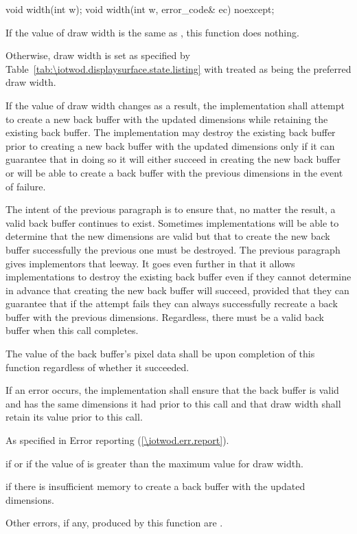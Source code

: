 %
\begin{itemdecl}
void width(int w);
void width(int w, error_code& ec) noexcept;
\end{itemdecl}
\begin{itemdescr}
\pnum
\effects
If the value of draw width is the same as , this function does nothing.

\pnum
Otherwise, draw width is set as specified by Table~\ref{tab:\iotwod.displaysurface.state.listing} with  treated as being the preferred draw width.

\pnum
If the value of draw width changes as a result, the implementation shall attempt to create a new back buffer with the updated dimensions while retaining the existing back buffer. The implementation may destroy the existing back buffer prior to creating a new back buffer with the updated dimensions only if it can guarantee that in doing so it will either succeed in creating the new back buffer or will be able to create a back buffer with the previous dimensions in the event of failure.

\pnum
\begin{note}
The intent of the previous paragraph is to ensure that, no matter the result, a valid back buffer continues to exist. Sometimes implementations will be able to determine that the new dimensions are valid but that to create the new back buffer successfully the previous one must be destroyed. The previous paragraph gives implementors that leeway. It goes even further in that it allows implementations to destroy the existing back buffer even if they cannot determine in advance that creating the new back buffer will succeed, provided that they can guarantee that if the attempt fails they can always successfully recreate a back buffer with the previous dimensions. Regardless, there must be a valid back buffer when this call completes.
\end{note}

\pnum
The value of the back buffer's pixel data shall be \unspecnorm upon completion of this function regardless of whether it succeeded.

\pnum
If an error occurs, the implementation shall ensure that the back buffer is valid and has the same dimensions it had prior to this call and that draw width shall retain its value prior to this call.

\pnum
\throws
As specified in Error reporting (\ref{\iotwod.err.report}).

\pnum
\errors
{} if  or if the value of  is greater than the maximum value for draw width.

\pnum
{} if there is insufficient memory to create a back buffer with the updated dimensions.

\pnum
Other errors, if any, produced by this function are .
\end{itemdescr}

